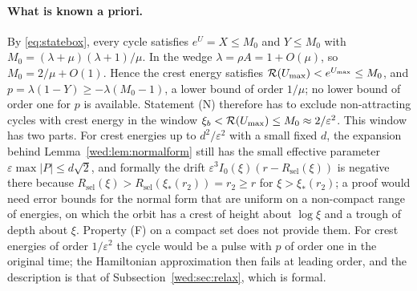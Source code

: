 \paragraph{What is known a priori.}
By \eqref{eq:statebox}, every cycle satisfies $e^U=X\le M_0$ and $Y\le M_0$ with $M_0=(\lambda+\mu)(\lambda+1)/\mu$. In the wedge $\lambda=\rho A=1+O(\mu)$, so $M_0=2/\mu+O(1)$. Hence the crest energy satisfies $\mathcal R(U_{\max})<e^{U_{\max}}\le M_0$, and $p=\lambda(1-Y)\ge-\lambda(M_0-1)$, a lower bound of order $1/\mu$; no lower bound of order one for $p$ is available. Statement \textup{(N)} therefore has to exclude non-attracting cycles with crest energy in the window $\xi_b<\mathcal R(U_{\max})\le M_0\approx2/\varepsilon^2$. This window has two parts. For crest energies up to $d^2/\varepsilon^2$ with a small fixed $d$, the expansion behind Lemma~\ref{wed:lem:normalform} still has the small effective parameter $\varepsilon\max|P|\le d\sqrt2$, and formally the drift $\varepsilon^3I_0(\xi)(r-R_{\mathrm{sel}}(\xi))$ is negative there because $R_{\mathrm{sel}}(\xi)>R_{\mathrm{sel}}(\xi_*(r_2))=r_2\ge r$ for $\xi>\xi_*(r_2)$; a proof would need error bounds for the normal form that are uniform on a non-compact range of energies, on which the orbit has a crest of height about $\log\xi$ and a trough of depth about $\xi$. Property \textup{(F)} on a compact set does not provide them. For crest energies of order $1/\varepsilon^2$ the cycle would be a pulse with $p$ of order one in the original time; the Hamiltonian approximation then fails at leading order, and the description is that of Subsection~\ref{wed:sec:relax}, which is formal.


